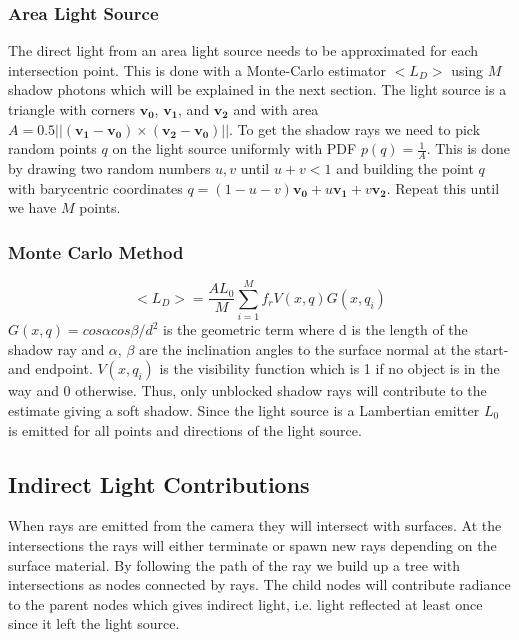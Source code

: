 \documentclass[a4paper, twocolumn]{article}
\begin{document}
            \subsubsection{Area Light Source} \label{sec:area_light_source}
            The direct light from an area light source needs to be approximated for each intersection point. This is done with a Monte-Carlo estimator $<L_D>$ using $M$ shadow photons which will be explained in the next section. The light source is a triangle with corners $\mathbf{v_0}$, $\mathbf{v_1}$, and $\mathbf{v_2}$ and with area $A = 0.5 ||(\mathbf{v_1} - \mathbf{v_0})\times(\mathbf{v_2}-\mathbf{v_0})||$. To get the shadow rays we need to pick random points $q$ on the light source uniformly with PDF $p(q) = \frac{1}{A}$. This is done by drawing two random numbers $u, v$ until $u + v < 1$ and building the point $q$ with barycentric coordinates $q = (1-u-v)\mathbf{v_0} + u\mathbf{v_1} + v\mathbf{v_2}$. Repeat this until we have $M$ points. 


            \subsubsection{Monte Carlo Method} \label{sec:monte_carlo_method}
            \begin{equation*}
              <L_D> = \frac{AL_0}{M}\sum_{i=1}^{M}{f_r V(x, q) G(x, q_i)}
            \end{equation*}
             $G(x, q) = cos\alpha cos\beta / d^2$ is the geometric term where d is the length of the shadow ray and $\alpha$, $\beta$ are the inclination angles to the surface normal at the start- and endpoint. $V(x, q_i)$ is the visibility function which is 1 if no object is in the way and 0 otherwise. Thus, only unblocked shadow rays will contribute to the estimate giving a soft shadow. Since the light source is a Lambertian emitter $L_0$ is emitted for all points and directions of the light source.
            
            \subsection{Indirect Light Contributions} \label{sec:indirect_light_contributions}
            When rays are emitted from the camera they will intersect with surfaces. At the intersections the rays will either terminate or spawn new rays depending on the surface material. By following the path of the ray we build up a tree with intersections as nodes connected by rays. The child nodes will contribute radiance to the parent nodes which gives indirect light, i.e. light reflected at least once since it left the light source.
\end{document}
